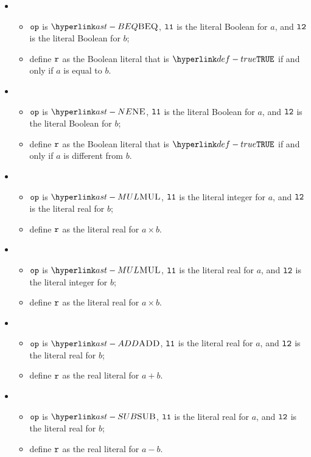 \begin{itemize}
  \item {}
  \begin{itemize}
    \item $\texttt{op}$ is $\BEQ$, $\texttt{l1}$ is the literal Boolean for $a$, and $\texttt{l2}$ is the literal Boolean for $b$;
    \item define $\texttt{r}$ as the Boolean literal that is $\True$ if and only if $a$ is equal to $b$.
  \end{itemize}

  \item {}
  \begin{itemize}
    \item $\texttt{op}$ is $\NE$, $\texttt{l1}$ is the literal Boolean for $a$, and $\texttt{l2}$ is the literal Boolean for $b$;
    \item define $\texttt{r}$ as the Boolean literal that is $\True$ if and only if $a$ is different from $b$.
  \end{itemize}

  \item {}
  \begin{itemize}
    \item $\texttt{op}$ is $\MUL$, $\texttt{l1}$ is the literal integer for $a$, and $\texttt{l2}$ is the literal real for $b$;
    \item define $\texttt{r}$ as the literal real for $a\times b$.
  \end{itemize}

  \item {}
  \begin{itemize}
    \item $\texttt{op}$ is $\MUL$, $\texttt{l1}$ is the literal real for $a$, and $\texttt{l2}$ is the literal integer for $b$;
    \item define $\texttt{r}$ as the literal real for $a\times b$.
  \end{itemize}

  \item {}
  \begin{itemize}
    \item $\texttt{op}$ is $\ADD$, $\texttt{l1}$ is the literal real for $a$, and $\texttt{l2}$ is the literal real for $b$;
    \item define $\texttt{r}$ as the real literal for $a + b$.
  \end{itemize}

  \item {}
  \begin{itemize}
    \item $\texttt{op}$ is $\SUB$, $\texttt{l1}$ is the literal real for $a$, and $\texttt{l2}$ is the literal real for $b$;
    \item define $\texttt{r}$ as the real literal for $a - b$.
  \end{itemize}


\end{itemize}
